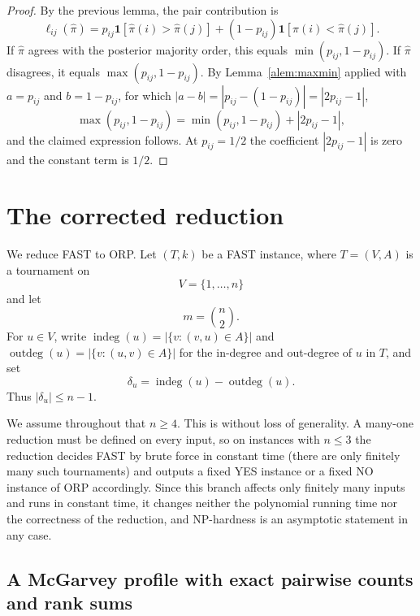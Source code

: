\documentclass[11pt]{article}
\newcommand{\ind}{\mathbf{1}}
\newcommand{\indeg}{\operatorname{indeg}}
\newcommand{\outdeg}{\operatorname{outdeg}}
\begin{document}
\begin{proof}
By the previous lemma, the pair contribution is
\begin{equation}
  \ell_{ij}(\hat\pi)=p_{ij}\ind[\hat\pi(i)>\hat\pi(j)]
  +(1-p_{ij})\ind[\hat\pi(i)<\hat\pi(j)].
\end{equation}
If $\hat\pi$ agrees with the posterior majority order, this equals $\min(p_{ij},1-p_{ij})$.  If $\hat\pi$ disagrees, it equals $\max(p_{ij},1-p_{ij})$.  By Lemma~\ref{alem:maxmin} applied with $a=p_{ij}$ and $b=1-p_{ij}$, for which $|a-b|=|p_{ij}-(1-p_{ij})|=|2p_{ij}-1|$,
\begin{equation}
  \max(p_{ij},1-p_{ij})=\min(p_{ij},1-p_{ij})+|2p_{ij}-1|,
\end{equation}
and the claimed expression follows.  At $p_{ij}=1/2$ the coefficient $|2p_{ij}-1|$ is zero and the constant term is $1/2$.
\end{proof}

\section{The corrected reduction}

We reduce FAST to ORP.  Let $(T,k)$ be a FAST instance, where $T=(V,A)$ is a tournament on
\begin{equation}
  V=\{1,\ldots,n\}
\end{equation}
and let
\begin{equation}
  m=\binom n2 .
\end{equation}
For $u\in V$, write $\indeg(u)=|\{v:(v,u)\in A\}|$ and $\outdeg(u)=|\{v:(u,v)\in A\}|$ for the in-degree and out-degree of $u$ in $T$, and set
\begin{equation}
  \delta_u=\indeg(u)-\outdeg(u).
\end{equation}
Thus $|\delta_u|\le n-1$.

We assume throughout that $n\ge 4$.  This is without loss of generality.  A many-one reduction must be defined on every input, so on instances with $n\le 3$ the reduction decides FAST by brute force in constant time (there are only finitely many such tournaments) and outputs a fixed YES instance or a fixed NO instance of ORP accordingly.  Since this branch affects only finitely many inputs and runs in constant time, it changes neither the polynomial running time nor the correctness of the reduction, and NP-hardness is an asymptotic statement in any case.

\subsection{A McGarvey profile with exact pairwise counts and rank sums}
\end{document}
